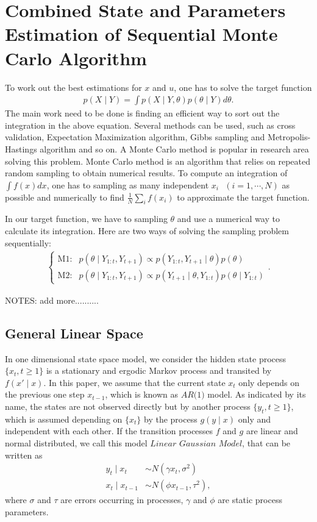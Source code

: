 


\section{Combined State and Parameters Estimation of Sequential Monte Carlo Algorithm}

To work out the best estimations for $x$ and $u$, one has to solve the target function
\begin{align}\label{objecfun}
p(X\mid Y) = \int p(X\mid Y,\theta)p(\theta\mid Y)d\theta.
\end{align} 
The main work need to be done is finding an efficient way to sort out the integration in the above equation. Several methods can be used, such as cross validation, Expectation Maximization algorithm, Gibbs sampling and Metropolis-Hastings algorithm and so on. A Monte Carlo method is popular in research area solving this problem. Monte Carlo method is an algorithm that relies on repeated random sampling to obtain numerical results. To compute an integration of $\int f(x)dx$, one has to sampling as many independent $x_i \mbox{ } (i = 1,\cdots, N)$ as possible and numerically to find $\frac{1}{N}\sum_i f(x_i)$ to approximate the target function. 

In our target function, we have to sampling $\theta$ and use a numerical way to calculate its integration. Here are two ways of solving the sampling problem sequentially: 
\begin{align*}
\begin{cases}
\mbox{M1}: & p(\theta\mid Y_{1:t},Y_{t+1}) \propto p(Y_{1:t},Y_{t+1}\mid\theta)p(\theta)\\
\mbox{M2}: & p(\theta\mid Y_{1:t},Y_{t+1}) \propto p(Y_{t+1}\mid\theta,Y_{1:t})p(\theta\mid Y_{1:t})
\end{cases}.
\end{align*}


NOTES: add more..........


\subsection{General Linear Space}
In one dimensional state space model, we consider the hidden state process $\{x_t, t\geq 1\}$ is a stationary and ergodic Markov process and transited by $f(x'\mid x)$. In this paper, we assume that the current state $x_t$ only depends on the previous one step $x_{t-1}$, which is known as $\textit{AR(1)}$ model. As indicated by its name, the states are not observed directly but by another process $\{y_t, t\geq 1\}$, which is assumed depending on $\{x_t\}$ by the process $g(y\mid x)$ only and independent with each other. If the transition processes $f$ and $g$ are linear and normal distributed, we call this model $\textit{Linear Gaussian Model}$, that can be written as
\begin{align*}
y_t\mid x_t      &\sim N(\gamma x_t,\sigma^2) \\
x_t\mid x_{t-1} &\sim N(\phi x_{t-1},\tau^2),
\end{align*}
where $\sigma$ and $\tau$ are errors occurring in processes, $\gamma$ and $\phi$ are static process parameters. 

